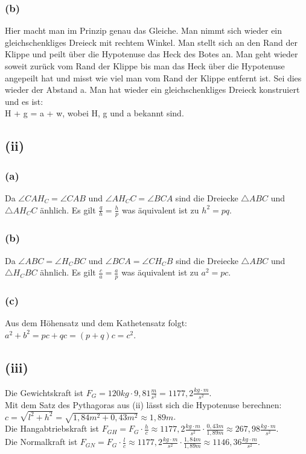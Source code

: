 \documentclass[12pt,a4paper]{article}
\begin{document}
\subsubsection*{(b)}
Hier macht man im Prinzip genau das Gleiche. Man nimmt sich wieder ein gleichschenkliges Dreieck mit rechtem Winkel. Man stellt sich an den Rand der Klippe und peilt über die Hypotenuse das Heck des Botes an. Man geht wieder soweit zurück vom Rand der Klippe bis man das Heck über die Hypotenuse angepeilt hat und misst wie viel man vom Rand der Klippe entfernt ist. Sei dies wieder der Abstand a. Man hat wieder ein gleichschenkliges Dreieck konstruiert und es ist: \\
H + g = a + w, wobei H, g und a bekannt sind.

\subsection*{(ii)}
\subsubsection*{(a)}
Da $\angle CAH_C = \angle CAB$ und $\angle AH_CC = \angle BCA$ sind die Dreiecke $\triangle ABC$ und $\triangle AH_CC$ änhlich. Es gilt $\frac{q}{h} = \frac{h}{p}$ was äquivalent ist zu $h^{2} = pq$.

\subsubsection*{(b)}
Da $\angle ABC = \angle H_CBC$ und $\angle BCA = \angle CH_CB$ sind die Dreiecke $\triangle ABC$ und $\triangle H_CBC$ ähnlich. Es gilt $\frac{c}{a} = \frac{a}{p}$ was äquivalent ist zu $a^{2} = pc$.

\subsubsection*{(c)}
Aus dem Höhensatz und dem Kathetensatz folgt:\\
$a^{2} + b^{2} = pc + qc = (p + q)c = c^{2}$.

\subsection*{(iii)}
Die Gewichtskraft ist $F_G = 120 kg \cdot 9,81 \frac{m}{s^{2}} = 1177,2 \frac{kg \cdot m}{s^{2}}$.\\
Mit dem Satz des Pythagoras aus (ii) lässt sich die Hypotenuse berechnen: \\
$c = \sqrt{l^{2} + h^{2}} = \sqrt{1,84m^{2} + 0,43m^{2}} \approx 1,89m$. \\
Die Hangabtriebskraft ist $F_{GH} = F_G \cdot \frac{h}{c} \approx 1177,2 \frac{kg \cdot m}{s^{2}} \cdot \frac{0,43m}{1,89m} \approx 267,98 \frac{kg \cdot m}{s^{2}}$. \\
Die Normalkraft ist $F_{GN} = F_G \cdot \frac{l}{c} \approx 1177,2 \frac{kg \cdot m}{s^{2}} \cdot \frac{1,84m}{1,89m} \approx 1146,36 \frac{kg \cdot m}{s^{2}}$.
\end{document}
